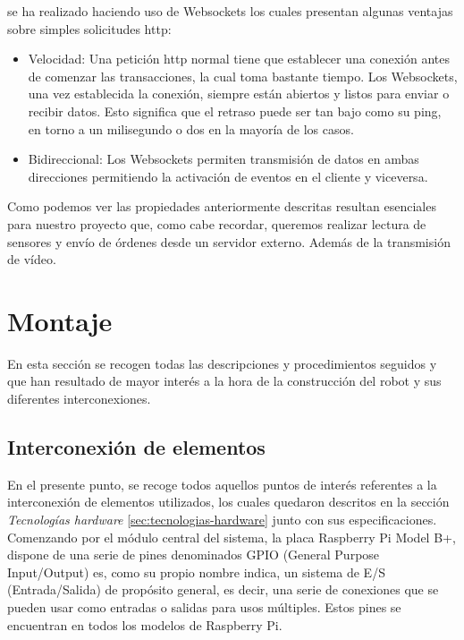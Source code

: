 se ha realizado haciendo uso de Websockets los cuales presentan algunas ventajas sobre simples solicitudes http:

\begin{itemize}
 \item Velocidad: Una petición http normal tiene que establecer una conexión antes de comenzar las transacciones, la cual toma bastante tiempo. 
 Los Websockets, una vez establecida la conexión, siempre están abiertos y listos para enviar o recibir datos. Esto significa que el retraso puede ser tan bajo como su ping,
 en torno a un milisegundo o dos en la mayoría de los casos.
 \item Bidireccional: Los Websockets permiten transmisión de datos en ambas direcciones permitiendo la activación de eventos en el cliente y viceversa.
\end{itemize}

Como podemos ver las propiedades anteriormente descritas resultan esenciales para nuestro proyecto que, como cabe recordar, queremos realizar lectura de sensores y envío de órdenes desde un servidor 
externo. Además de la transmisión de vídeo.\\

\section{Montaje}

En esta sección se recogen todas las descripciones y procedimientos seguidos y que han resultado de mayor interés a la hora de la construcción del robot y sus diferentes interconexiones.\\

\subsection{Interconexión de elementos}

En el presente punto, se recoge todos aquellos puntos de interés referentes a la interconexión de elementos utilizados, los cuales quedaron descritos en la sección \emph{Tecnologías hardware}
\ref{sec:tecnologias-hardware} junto con sus especificaciones.\\

Comenzando por el módulo central del sistema, la placa Raspberry Pi Model B+, dispone de una serie de pines denominados GPIO (General Purpose Input/Output) es, como su propio nombre indica, 
un sistema de E/S (Entrada/Salida) de propósito general, es decir, una serie de conexiones que se pueden usar como entradas o salidas para usos múltiples. Estos pines se encuentran en todos
los modelos de Raspberry Pi.\\

